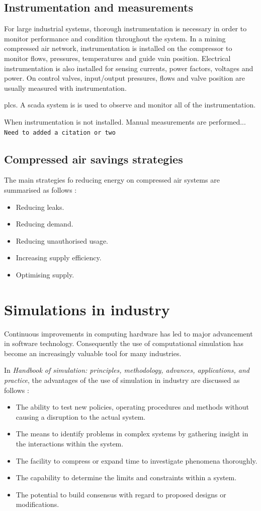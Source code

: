 	\subsection{Instrumentation and measurements}
	For large industrial systems, thorough instrumentation is necessary in order to monitor performance and condition throughout the system. In a mining compressed air network, instrumentation is installed on the compressor to monitor flows, pressures, temperatures and guide vain position. Electrical instrumentation is also installed for sensing currents, power factors, voltages and power. On control valves, input/output pressures, flows and valve position are usually measured with instrumentation.	
	\par
	\Glspl{plc}. A \gls{scada} system is is used to observe and monitor all of the instrumentation. 
	\par
	When instrumentation is not installed. Manual measurements are performed...
	\texttt{Need to added a citation or two}
	\subsection{Compressed air savings strategies}
	The main strategies fo reducing energy on compressed air systems are summarised as follows \cite{Snyman2011Masters}:
	\begin{itemize}
		\item Reducing leaks.
		\item Reducing demand.
		\item Reducing unauthorised usage.
		\item Increasing supply efficiency.
		\item Optimising supply.
	\end{itemize}
\section{Simulations in industry}
Continuous improvements in computing hardware has led to major advancement in software technology. Consequently the use of computational simulation has become an increasingly valuable tool for many industries.\cite{kocsis2003integration} \par 
 In \textit{ Handbook of simulation: principles, methodology, advances, applications, and practice}, the advantages of the use of simulation in industry are discussed as follows \cite{banks1998handbook}: 
\begin{itemize}
	\item The ability to test new policies, operating procedures and methods without causing a disruption to the actual system.
	\item The means to identify problems in complex systems by gathering insight in the interactions within the system.
	\item The facility to compress or expand time to investigate phenomena thoroughly.
	\item The capability to determine the limits and constraints within a system.
	\item The potential to build consensus with regard to proposed designs or modifications.
\end{itemize}
